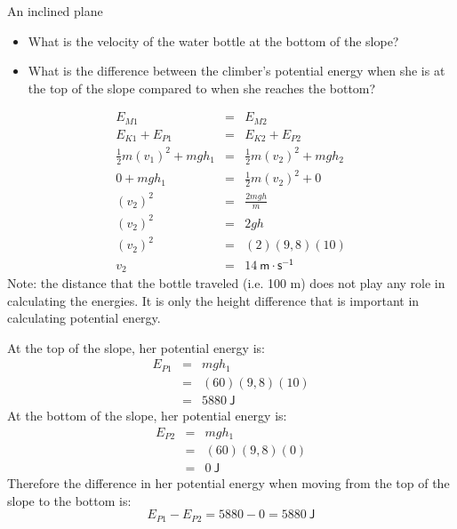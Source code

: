 \begin{wex}{An inclined plane}
{
\begin{itemize}
\item What is the velocity of the water bottle at the bottom of the slope?
\item What is the difference between the climber's potential energy when she is at the top of the slope compared to when she reaches the bottom?
\end{itemize}

\begin{eqnarray*}
E_{M1} &=& E_{M2} \\
E_{K1} + E_{P1} &=& E_{K2} + E_{P2} \\
\frac{1}{2}m(v_{1})^2 + mgh_{1} &=& \frac{1}{2}m(v_{2})^2 + mgh_{2}\\
0 + mgh_{1} &=& \frac{1}{2}m(v_{2})^2 + 0 \\
(v_{2})^2 &=& \frac{2mgh}{m} \\
(v_{2})^2 &=& 2gh \\
(v_{2})^2 &=& (2)(9,8)(10) \\
v_2 &=& 14 \ \mathsf{m \cdot s^{-1}}
\end{eqnarray*}
Note: the distance that the bottle traveled (i.e. 100 m) does not play any role in calculating the energies. It is only the height difference that is important in calculating potential energy.

At the top of the slope, her potential energy is:
\begin{eqnarray*}
E_{P1} &=& mgh_1 \\
&=& (60)(9,8)(10) \\
&=& 5880 \ \mathsf{J}
\end{eqnarray*}
At the bottom of the slope, her potential energy is:
\begin{eqnarray*}
E_{P2} &=& mgh_1 \\
&=& (60)(9,8)(0) \\
&=& 0 \ \mathsf{J}
\end{eqnarray*}
Therefore the difference in her potential energy when moving from the top of the slope to the bottom is:
\begin{equation*}
E_{P1} - E_{P2} = 5880 - 0 = 5880 \ \mathsf{J}
\end{equation*}
}
\end{wex}





